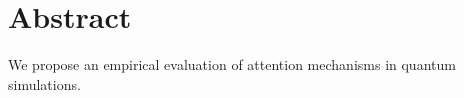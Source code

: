 \section{Abstract}

We propose an empirical evaluation of attention mechanisms in quantum simulations.
